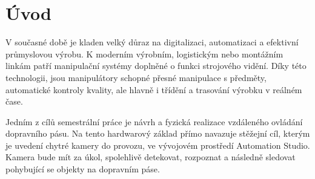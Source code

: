 \chapter*{Úvod}
{}

V současné době je kladen velký důraz na digitalizaci, automatizaci a efektivní průmyslovou výrobu. K moderním výrobním, logistickým nebo montážním linkám patří manipulační systémy doplněné o funkci strojového vidění. Díky této technologii, jsou manipulátory schopné přesné manipulace s předměty, automatické kontroly kvality, ale hlavně i třídění a trasování výrobku v reálném čase. 

Jedním z cílů semestrální práce je návrh a fyzická realizace vzdáleného ovládání dopravního pásu. Na tento hardwarový základ přímo navazuje stěžejní cíl, kterým je uvedení chytré kamery do provozu, ve vývojovém prostředí Automation Studio. Kamera bude mít za úkol, spolehlivě detekovat, rozpoznat a následně sledovat pohybující se objekty na dopravním páse.



